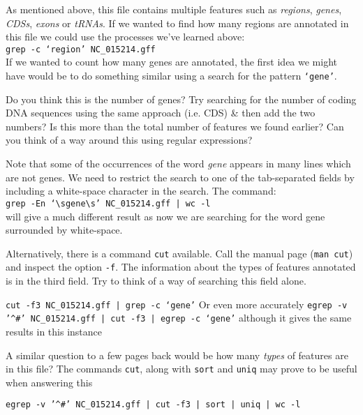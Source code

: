 \begin{bonus}
As mentioned above, this file contains multiple features such as \textit{regions}, \textit{genes}, \textit{CDSs}, \textit{exons} or \textit{tRNAs}.
If we wanted to find how many regions are annotated in this file we could use the processes we've learned above: \\
\texttt{grep -c `region' NC\_015214.gff} \\

If we wanted to count how many genes are annotated, the first idea we might have would be to do something similar using a search for the pattern \texttt{`gene'}. \\
\begin{questions}
Do you think this is the number of genes?
Try searching for the number of coding DNA sequences using the same approach (i.e. CDS) \& then add the two numbers?
Is this more than the total number of features we found earlier?
Can you think of a way around this using regular expressions?
\begin{answer}
Note that some of the occurrences of the word \textit{gene} appears in many lines which are not genes.
We need to restrict the search to one of the tab-separated fields by including a white-space character in the search.
The command:\\
\texttt{grep -En `\textbackslash sgene\textbackslash s' NC\_015214.gff | wc -l} \\
will give a much different result as now we are searching for the word gene surrounded by white-space.
\end{answer}

Alternatively, there is a command \texttt{cut} available.
Call the manual page (\texttt{man cut}) and inspect the option \texttt{-f}.
The information about the types of features annotated is in the third field.
Try to think of a way of searching this field alone.
\begin{answer}
\texttt{cut -f3 NC\_015214.gff | grep -c `gene'}
Or even more accurately
\texttt{egrep -v '\^{}\#' NC\_015214.gff | cut -f3 | egrep -c `gene'}
although it gives the same results in this instance
\end{answer}

A similar question to a few pages back would be how many \textit{types} of features are in this file?
The commands \texttt{cut}, along with \texttt{sort} and \texttt{uniq} may prove to be useful when answering this
\begin{answer}
\texttt{egrep -v '\^{}\#' NC\_015214.gff | cut -f3 | sort | uniq | wc -l}
\end{answer}

\end{questions}
\end{bonus}

